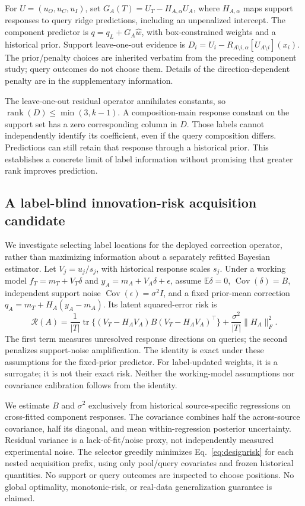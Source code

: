 \documentclass[11pt]{article}
\begin{document}
For $U=(u_O,u_C,u_I)$, set $G_A(T)=U_T-H_{A,\alpha}U_A$, where $H_{A,\alpha}$ maps support responses to query ridge predictions, including an unpenalized intercept. The component predictor is $q=q_L+G_A\widehat w$, with box-constrained weights and a historical prior. Support leave-one-out evidence is $D_i=U_i-R_{A\setminus i,\alpha}[U_{A\setminus i}](x_i)$. The prior/penalty choices are inherited verbatim from the preceding component study; query outcomes do not choose them. Details of the direction-dependent penalty are in the supplementary information.

The leave-one-out residual operator annihilates constants, so $\operatorname{rank}(D)\leq\min(3,k-1)$. A composition-main response constant on the support set has a zero corresponding column in $D$. Those labels cannot independently identify its coefficient, even if the query composition differs. Predictions can still retain that response through a historical prior. This establishes a concrete limit of label information without promising that greater rank improves prediction.

\subsection{A label-blind innovation-risk acquisition candidate}
We investigate selecting label locations for the deployed correction operator, rather than maximizing information about a separately refitted Bayesian estimator. Let $V_j=u_j/s_j$, with historical response scales $s_j$. Under a working model $f_T=m_T+V_T\delta$ and $y_A=m_A+V_A\delta+\epsilon$, assume $\mathbb E\delta=0$, $\operatorname{Cov}(\delta)=B$, independent support noise $\operatorname{Cov}(\epsilon)=\sigma^2I$, and a fixed prior-mean correction $q_A=m_T+H_A(y_A-m_A)$. Its latent squared-error risk is
\begin{equation}\label{eq:designrisk}
\mathcal R(A)=\frac1{|T|}\operatorname{tr}\{(V_T-H_AV_A)B(V_T-H_AV_A)^\top\}
+\frac{\sigma^2}{|T|}\|H_A\|_F^2.
\end{equation}
The first term measures unresolved response directions on queries; the second penalizes support-noise amplification. The identity is exact under these assumptions for the fixed-prior predictor. For label-updated weights, it is a surrogate; it is not their exact risk. Neither the working-model assumptions nor covariance calibration follows from the identity.

We estimate $B$ and $\sigma^2$ exclusively from historical source-specific regressions on cross-fitted component responses. The covariance combines half the across-source covariance, half its diagonal, and mean within-regression posterior uncertainty. Residual variance is a lack-of-fit/noise proxy, not independently measured experimental noise. The selector greedily minimizes Eq.~\ref{eq:designrisk} for each nested acquisition prefix, using only pool/query covariates and frozen historical quantities. No support or query outcomes are inspected to choose positions. No global optimality, monotonic-risk, or real-data generalization guarantee is claimed.
\end{document}
